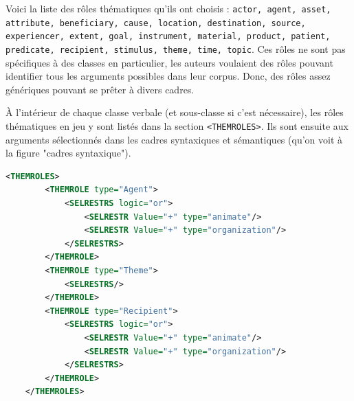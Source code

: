 Voici la liste des rôles thématiques qu'ils ont choisis : \texttt{actor, agent, asset, attribute, beneficiary, cause, location, destination, source, experiencer, extent, goal, instrument, material, product, patient, predicate, recipient, stimulus, theme, time, topic}. Ces rôles ne sont pas spécifiques à des classes en particulier, les auteurs voulaient des rôles pouvant identifier tous les arguments possibles dans leur corpus. Donc, des rôles assez génériques pouvant se prêter à divers cadres.


	

À l'intérieur de chaque classe verbale (et sous-classe si c'est nécessaire), les rôles thématiques en jeu y sont listés dans la section \lstinline|<THEMROLES>|. Ils sont ensuite  aux arguments sélectionnés dans les cadres syntaxiques et sémantiques (qu'on voit à la figure "cadres syntaxique").

\begin{lstlisting}[language=XML, caption = Les rôles thématiques] % Majuscule aux captions
    <THEMROLES>
        <THEMROLE type="Agent">
            <SELRESTRS logic="or">
                <SELRESTR Value="+" type="animate"/>
                <SELRESTR Value="+" type="organization"/>
            </SELRESTRS>
        </THEMROLE>
        <THEMROLE type="Theme">
            <SELRESTRS/>
        </THEMROLE>
        <THEMROLE type="Recipient">
            <SELRESTRS logic="or">
                <SELRESTR Value="+" type="animate"/>
                <SELRESTR Value="+" type="organization"/>
            </SELRESTRS>
        </THEMROLE>
    </THEMROLES>
\end{lstlisting}


